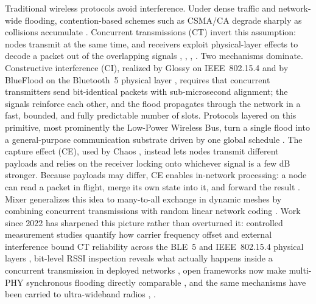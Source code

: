 \documentclass[journal]{IEEEtran}
\newcommand{\CI}{CI}                      %
\newcommand{\CE}{CE}                      %
\begin{document}
Traditional wireless protocols avoid interference. Under dense traffic and
network-wide flooding, contention-based schemes such as CSMA/CA degrade
sharply as collisions accumulate \cite{zimmerling20survey}. Concurrent
transmissions (CT) invert this assumption: nodes transmit at the same time,
and receivers exploit physical-layer effects to decode a packet out of the
overlapping signals \cite{zimmerling20survey}, \cite{wilhelm14reception},
\cite{baddeley20phy}, \cite{baddeley23understanding}. Two mechanisms
dominate. Constructive interference (\CI), realized by Glossy on
IEEE~802.15.4 \cite{ferrari11glossy} and by BlueFlood on the Bluetooth~5
physical layer \cite{alnahas19blueflood,alnahas21blueflood}, requires that
concurrent transmitters send bit-identical packets with sub-microsecond
alignment; the signals reinforce each other, and the flood propagates
through the network in a fast, bounded, and fully predictable number of
slots. Protocols layered on this primitive, most prominently the
Low-Power Wireless Bus, turn a single flood into a general-purpose
communication substrate driven by one global schedule
\cite{ferrari12lwb}. The capture effect (\CE), used by Chaos \cite{landsiedel13chaos},
instead lets nodes transmit different payloads and relies on the receiver
locking onto whichever signal is a few dB stronger. Because payloads may
differ, \CE{} enables in-network processing: a node can read a packet in
flight, merge its own state into it, and forward the result
\cite{landsiedel13chaos}. Mixer generalizes this idea to many-to-all
exchange in dynamic meshes by combining concurrent transmissions with
random linear network coding \cite{herrmann18mixer}. Work since 2022
has sharpened this picture
rather than overturned it: controlled measurement studies quantify how
carrier frequency offset and external interference bound CT reliability
across the BLE~5 and IEEE~802.15.4 physical layers
\cite{baddeley23understanding}, bit-level RSSI inspection reveals what
actually happens inside a concurrent transmission in deployed networks
\cite{herrmann22rssispy}, open frameworks now make multi-PHY synchronous
flooding directly comparable \cite{baddeley22osf}, and the same
mechanisms have been carried to ultra-wideband radios
\cite{schuh24uwb}, \cite{trobinger24uwbcontrol}.
\end{document}
